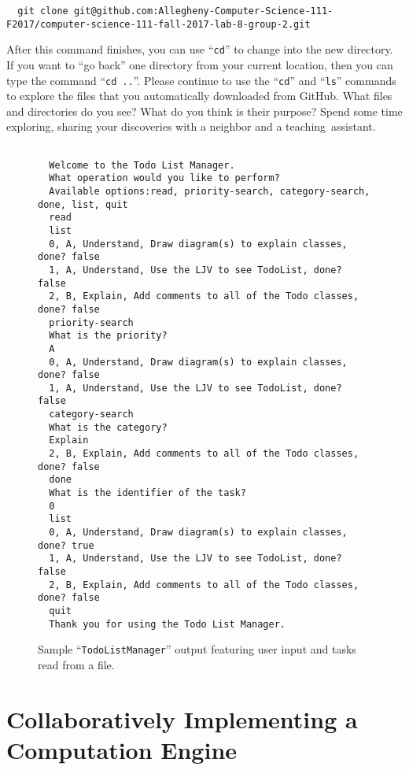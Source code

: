 \documentclass[11pt]{article}
\newcommand{\command}[1]{``\lstinline{#1}''}
\newcommand{\step}[1]{``{#1}''}
\begin{document}
\begin{lstlisting}
  git clone git@github.com:Allegheny-Computer-Science-111-F2017/computer-science-111-fall-2017-lab-8-group-2.git
\end{lstlisting}

After this command finishes, you can use \command{cd} to change into the new directory. If you want to \step{go back}
one directory from your current location, then you can type the command \command{cd ..}. Please continue to use the
\command{cd} and \command{ls} commands to explore the files that you automatically downloaded from GitHub. What files
and directories do you see? What do you think is their purpose? Spend some time exploring, sharing your discoveries with
a neighbor and a \mbox{teaching assistant}.

\begin{figure}[tb]
  \begin{Verbatim}[commandchars=\\\{\}]

  Welcome to the Todo List Manager.
  What operation would you like to perform?
  Available options:read, priority-search, category-search, done, list, quit
  read
  list
  0, A, Understand, Draw diagram(s) to explain classes, done? false
  1, A, Understand, Use the LJV to see TodoList, done? false
  2, B, Explain, Add comments to all of the Todo classes, done? false
  priority-search
  What is the priority?
  A
  0, A, Understand, Draw diagram(s) to explain classes, done? false
  1, A, Understand, Use the LJV to see TodoList, done? false
  category-search
  What is the category?
  Explain
  2, B, Explain, Add comments to all of the Todo classes, done? false
  done
  What is the identifier of the task?
  0
  list
  0, A, Understand, Draw diagram(s) to explain classes, done? true
  1, A, Understand, Use the LJV to see TodoList, done? false
  2, B, Explain, Add comments to all of the Todo classes, done? false
  quit
  Thank you for using the Todo List Manager.
\end{Verbatim}
\vspace*{-.1in}
\caption{Sample ``{\tt TodoListManager}'' output featuring user input and tasks read from a file.}
\label{fig:output}
\end{figure}

\section*{Collaboratively Implementing a Computation Engine}
\end{document}
